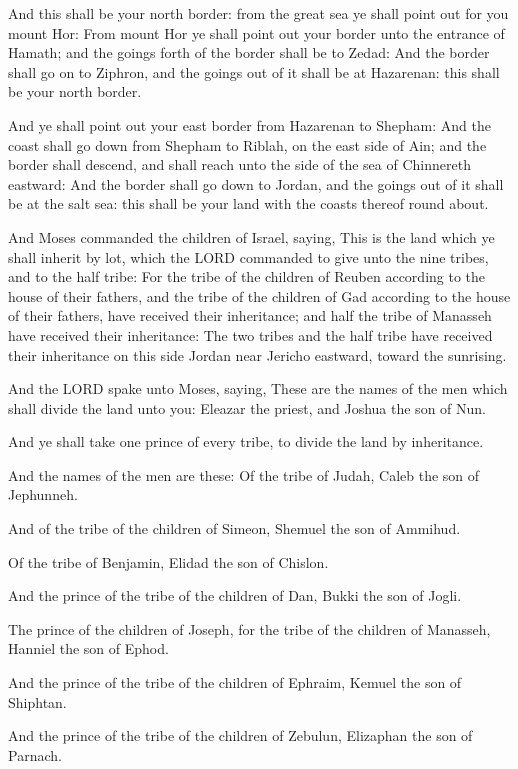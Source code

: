 \Verse And this shall be your north border: from the great sea ye shall
point out for you mount Hor: \Verse From mount Hor ye shall point out
your border unto the entrance of Hamath; and the goings forth of the
border shall be to Zedad: \Verse And the border shall go on to Ziphron,
and the goings out of it shall be at Hazarenan: this shall be your
north border.

\Verse And ye shall point out your east border from Hazarenan to
Shepham: \Verse And the coast shall go down from Shepham to Riblah, on
the east side of Ain; and the border shall descend, and shall reach
unto the side of the sea of Chinnereth eastward: \Verse And the border
shall go down to Jordan, and the goings out of it shall be at the salt
sea: this shall be your land with the coasts thereof round about.

\Verse And Moses commanded the children of Israel, saying, This is the
land which ye shall inherit by lot, which the LORD commanded to give
unto the nine tribes, and to the half tribe: \Verse For the tribe of
the children of Reuben according to the house of their fathers, and
the tribe of the children of Gad according to the house of their
fathers, have received their inheritance; and half the tribe of
Manasseh have received their inheritance: \Verse The two tribes and the
half tribe have received their inheritance on this side Jordan near
Jericho eastward, toward the sunrising.

\Verse And the LORD spake unto Moses, saying, \Verse These are the names
of the men which shall divide the land unto you: Eleazar the priest,
and Joshua the son of Nun.

\Verse And ye shall take one prince of every tribe, to divide the land
by inheritance.

\Verse And the names of the men are these: Of the tribe of Judah, Caleb
the son of Jephunneh.

\Verse And of the tribe of the children of Simeon, Shemuel the son of
Ammihud.

\Verse Of the tribe of Benjamin, Elidad the son of Chislon.

\Verse And the prince of the tribe of the children of Dan, Bukki the
son of Jogli.

\Verse The prince of the children of Joseph, for the tribe of the
children of Manasseh, Hanniel the son of Ephod.

\Verse And the prince of the tribe of the children of Ephraim, Kemuel
the son of Shiphtan.

\Verse And the prince of the tribe of the children of Zebulun,
Elizaphan the son of Parnach.

